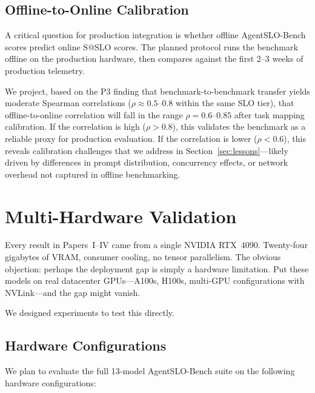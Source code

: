 \documentclass[11pt]{article}
\makeatletter
\newcommand{\sslo}{\ensuremath{\mathrm{S@SLO}}}
\makeatother
\begin{document}
\subsection{Offline-to-Online Calibration}

A critical question for production integration is whether offline AgentSLO-Bench scores predict online $\sslo{}$ scores. The planned protocol runs the benchmark offline on the production hardware, then compares against the first 2--3 weeks of production telemetry.

We project, based on the P3 finding that benchmark-to-benchmark transfer yields moderate Spearman correlations ($\rho \approx 0.5$--$0.8$ within the same SLO tier), that offline-to-online correlation will fall in the range $\rho = 0.6$--$0.85$ after task mapping calibration. If the correlation is high ($\rho > 0.8$), this validates the benchmark as a reliable proxy for production evaluation. If the correlation is lower ($\rho < 0.6$), this reveals calibration challenges that we address in Section~\ref{sec:lessons}---likely driven by differences in prompt distribution, concurrency effects, or network overhead not captured in offline benchmarking.

\section{Multi-Hardware Validation}
\label{sec:hardware}

Every result in Papers~I--IV came from a single NVIDIA RTX~4090. Twenty-four gigabytes of VRAM, consumer cooling, no tensor parallelism. The obvious objection: perhaps the deployment gap is simply a hardware limitation. Put these models on real datacenter GPUs---A100s, H100s, multi-GPU configurations with NVLink---and the gap might vanish.

We designed experiments to test this directly.

\subsection{Hardware Configurations}

We plan to evaluate the full 13-model AgentSLO-Bench suite on the following hardware configurations:
\end{document}

